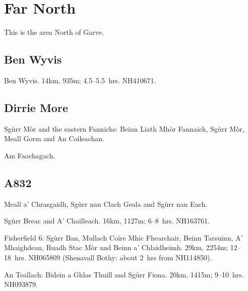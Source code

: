 \section{Far North}

This is the area North of Garve.

\subsection{Ben Wyvis}

\begin{munros}
\item
Ben Wyvis.  14km, 935m; 4.5--5.5~hrs. NH410671.  \tick
\end{munros}


\subsection{Dirrie More}

\begin{munros}
\item
Sgùrr Mòr and the eastern Fannichs: Beinn Liath Mhòr Fannaich, Sgùrr Mòr,
Meall Gorm and An Coileachan.  \tick

\item
Am Faochagach.  \tick
\end{munros}


\subsection{A832}

\begin{munros}
\item
Meall a' Chrasgaidh, Sgùrr nan Clach Geala and Sgùrr nan Each.  \tick

\item\target\target
Sgùrr Breac and A' Chailleach.  16km, 1127m; 6--8~hrs. NH163761.  \tick

\item\target\target Fisherfield 6: Sgùrr Ban, Mullach Coire Mhic Fhearchair,
  Beinn Tarsuinn, A' Mhaighdean, Ruadh Stac Mòr and Beinn a' Chlaidheimh.
  29km, 2254m; 12--18~hrs.  NH065809 (Shenavall Bothy: about 2~hrs from
  NH114850).  \tick

\item\target\target
An Teallach: Bidein a Ghlas Thuill and Sgùrr Fiona.    20km, 1415m;
9--10~hrs.  NH093879.  \tick
\end{munros}

